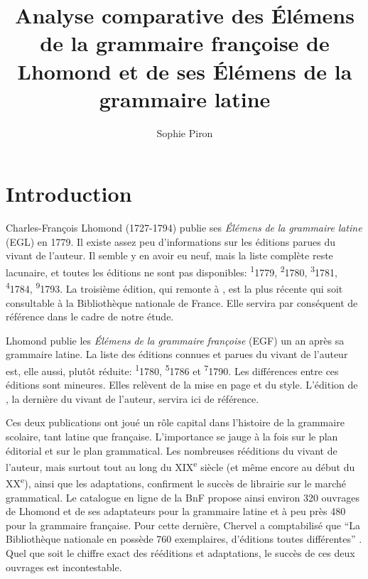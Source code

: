 \documentclass[output=paper]{langsci/langscibook}
\author{Sophie Piron\affiliation{Université du Québec à Montréal}\orcid{}}
\title{Analyse comparative des Élémens de la grammaire françoise de Lhomond et de ses Élémens de la grammaire latine}
\begin{document}
\maketitle

\section{Introduction} 

 Charles-François Lhomond (1727-1794) publie ses \textit{Élémens} \textit{de} \textit{la} \textit{grammaire} \textit{latine} (EGL) en 1779. Il existe assez peu d’informations sur les éditions parues du vivant de l’auteur. Il semble y en avoir eu neuf, mais la liste complète reste lacunaire, et toutes les éditions ne sont pas disponibles: \textsuperscript{1}1779, \textsuperscript{2}1780, \textsuperscript{3}1781, \textsuperscript{4}1784, \textsuperscript{9}1793. La troisième édition, qui remonte à \citeyear{lhomond_elemens_1781}, est la plus récente qui soit consultable à la Bibliothèque nationale de France. Elle servira par conséquent de référence dans le cadre de notre étude. 

Lhomond publie les \textit{Élémens} \textit{de} \textit{la} \textit{grammaire} \textit{françoise} (EGF) un an après sa grammaire latine. La liste des éditions connues et parues du vivant de l’auteur est, elle aussi, plutôt réduite: \textsuperscript{1}1780, \textsuperscript{5}1786 et \textsuperscript{7}1790. Les différences entre ces éditions sont mineures. Elles relèvent de la mise en page et du style. L’édition de \citeyear{lhomond_elemens_1790}, la dernière du vivant de l’auteur, servira ici de référence.

Ces deux publications ont joué un rôle capital dans l’histoire de la grammaire scolaire, tant latine que française. L’importance se jauge à la fois sur le plan éditorial et sur le plan grammatical. Les nombreuses rééditions du vivant de l’auteur, mais surtout tout au long du XIX\textsuperscript{e} siècle (et même encore au début du XX\textsuperscript{e}), ainsi que les adaptations, confirment le succès de librairie sur le marché grammatical. Le catalogue en ligne de la BnF propose ainsi environ 320 ouvrages de Lhomond et de ses adaptateurs pour la grammaire latine et à peu près 480 pour la grammaire française. Pour cette dernière, Chervel a comptabilisé que “La Bibliothèque nationale en possède 760 exemplaires, d’éditions toutes différentes” \citep[63]{chervel_et_1977}. Quel que soit le chiffre exact des rééditions et adaptations, le succès de ces deux ouvrages est incontestable.
\end{document}
